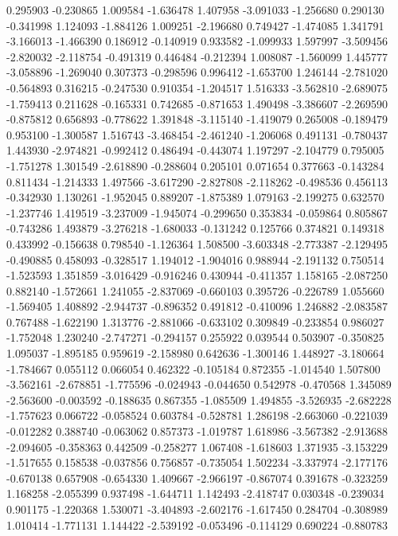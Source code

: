 0.295903
-0.230865
1.009584
-1.636478
1.407958
-3.091033
-1.256680
0.290130
-0.341998
1.124093
-1.884126
1.009251
-2.196680
0.749427
-1.474085
1.341791
-3.166013
-1.466390
0.186912
-0.140919
0.933582
-1.099933
1.597997
-3.509456
-2.820032
-2.118754
-0.491319
0.446484
-0.212394
1.008087
-1.560099
1.445777
-3.058896
-1.269040
0.307373
-0.298596
0.996412
-1.653700
1.246144
-2.781020
-0.564893
0.316215
-0.247530
0.910354
-1.204517
1.516333
-3.562810
-2.689075
-1.759413
0.211628
-0.165331
0.742685
-0.871653
1.490498
-3.386607
-2.269590
-0.875812
0.656893
-0.778622
1.391848
-3.115140
-1.419079
0.265008
-0.189479
0.953100
-1.300587
1.516743
-3.468454
-2.461240
-1.206068
0.491131
-0.780437
1.443930
-2.974821
-0.992412
0.486494
-0.443074
1.197297
-2.104779
0.795005
-1.751278
1.301549
-2.618890
-0.288604
0.205101
0.071654
0.377663
-0.143284
0.811434
-1.214333
1.497566
-3.617290
-2.827808
-2.118262
-0.498536
0.456113
-0.342930
1.130261
-1.952045
0.889207
-1.875389
1.079163
-2.199275
0.632570
-1.237746
1.419519
-3.237009
-1.945074
-0.299650
0.353834
-0.059864
0.805867
-0.743286
1.493879
-3.276218
-1.680033
-0.131242
0.125766
0.374821
0.149318
0.433992
-0.156638
0.798540
-1.126364
1.508500
-3.603348
-2.773387
-2.129495
-0.490885
0.458093
-0.328517
1.194012
-1.904016
0.988944
-2.191132
0.750514
-1.523593
1.351859
-3.016429
-0.916246
0.430944
-0.411357
1.158165
-2.087250
0.882140
-1.572661
1.241055
-2.837069
-0.660103
0.395726
-0.226789
1.055660
-1.569405
1.408892
-2.944737
-0.896352
0.491812
-0.410096
1.246882
-2.083587
0.767488
-1.622190
1.313776
-2.881066
-0.633102
0.309849
-0.233854
0.986027
-1.752048
1.230240
-2.747271
-0.294157
0.255922
0.039544
0.503907
-0.350825
1.095037
-1.895185
0.959619
-2.158980
0.642636
-1.300146
1.448927
-3.180664
-1.784667
0.055112
0.066054
0.462322
-0.105184
0.872355
-1.014540
1.507800
-3.562161
-2.678851
-1.775596
-0.024943
-0.044650
0.542978
-0.470568
1.345089
-2.563600
-0.003592
-0.188635
0.867355
-1.085509
1.494855
-3.526935
-2.682228
-1.757623
0.066722
-0.058524
0.603784
-0.528781
1.286198
-2.663060
-0.221039
-0.012282
0.388740
-0.063062
0.857373
-1.019787
1.618986
-3.567382
-2.913688
-2.094605
-0.358363
0.442509
-0.258277
1.067408
-1.618603
1.371935
-3.153229
-1.517655
0.158538
-0.037856
0.756857
-0.735054
1.502234
-3.337974
-2.177176
-0.670138
0.657908
-0.654330
1.409667
-2.966197
-0.867074
0.391678
-0.323259
1.168258
-2.055399
0.937498
-1.644711
1.142493
-2.418747
0.030348
-0.239034
0.901175
-1.220368
1.530071
-3.404893
-2.602176
-1.617450
0.284704
-0.308989
1.010414
-1.771131
1.144422
-2.539192
-0.053496
-0.114129
0.690224
-0.880783
